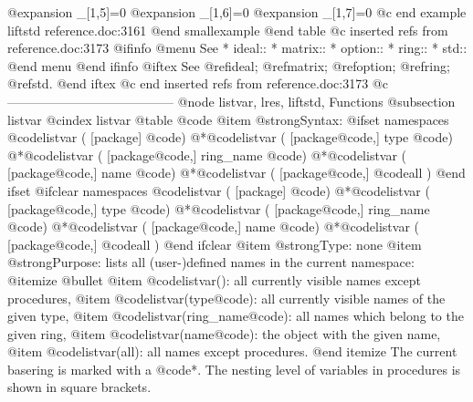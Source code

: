 {@expansion{} _[1,5]=0
@expansion{} _[1,6]=0
@expansion{} _[1,7]=0
@c end example liftstd reference.doc:3161
@end smallexample
@end table
@c inserted refs from reference.doc:3173
@ifinfo
@menu
See
* ideal::
* matrix::
* option::
* ring::
* std::
@end menu
@end ifinfo
@iftex
See
@ref{ideal};
@ref{matrix};
@ref{option};
@ref{ring};
@ref{std}.
@end iftex
@c end inserted refs from reference.doc:3173
@c ---------------------------------------
@node listvar, lres, liftstd, Functions
@subsection listvar
@cindex listvar
@table @code
@item @strong{Syntax:}
@ifset namespaces
@code{listvar (} [package] @code{)}
@*@code{listvar (} [package@code{,}] type @code{)}
@*@code{listvar (} [package@code{,}] ring_name @code{)}
@*@code{listvar (} [package@code{,}] name @code{)}
@*@code{listvar (} [package@code{,}] @code{all )}
@end ifset
@ifclear namespaces
@code{listvar (} [package] @code{)}
@*@code{listvar (} [package@code{,}] type @code{)}
@*@code{listvar (} [package@code{,}] ring_name @code{)}
@*@code{listvar (} [package@code{,}] name @code{)}
@*@code{listvar (} [package@code{,}] @code{all )}
@end ifclear
@item @strong{Type:}
none
@item @strong{Purpose:}
lists all (user-)defined names in the current namespace:
@itemize @bullet
@item @code{listvar()}: all currently visible names except procedures,
@item @code{listvar(}type@code{)}: all currently visible names of the given
type,
@item @code{listvar(}ring_name@code{)}: all names which belong to the given
ring,
@item @code{listvar(}name@code{)}: the object with the given name,
@item @code{listvar(all)}: all names except procedures.
@end itemize
The current basering is marked with a @code{*}.  The nesting level of
variables in procedures is shown in square brackets.

}
